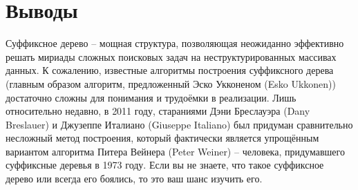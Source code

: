 \section{Выводы}

Суффиксное дерево – мощная структура, позволяющая неожиданно эффективно решать мириады сложных поисковых задач на неструктурированных массивах данных. К сожалению, известные алгоритмы построения суффиксного дерева (главным образом алгоритм, предложенный Эско Укконеном (Esko Ukkonen)) достаточно сложны для понимания и трудоёмки в реализации. Лишь относительно недавно, в 2011 году, стараниями Дэни Бреслауэра (Dany Breslauer) и Джузеппе Италиано (Giuseppe Italiano) был придуман сравнительно несложный метод построения, который фактически является упрощённым вариантом алгоритма Питера Вейнера (Peter Weiner) – человека, придумавшего суффиксные деревья в 1973 году. Если вы не знаете, что такое суффиксное дерево или всегда его боялись, то это ваш шанс изучить его.
\pagebreak